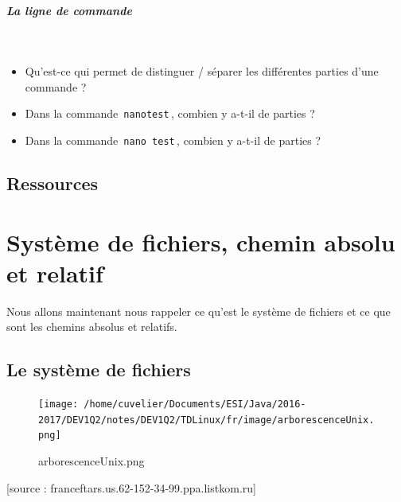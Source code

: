 \documentclass[11pt,a4paper]{article}
\begin{document}
			
		\subparagraph{La ligne de commande} 
		
                \textcolor{white}{.} \par
            
					\begin{itemize}
				
			\item 
										Qu'est-ce qui permet de distinguer / s\'eparer les diff\'erentes parties d'une commande ? 
										 \textcolor{gray}{\underline{\hspace*{10em}}} 
			\item 
										Dans la commande \,\verb|nanotest|\,, combien y a-t-il de parties ?  
										 \textcolor{gray}{\underline{\hspace*{1em}}} 
			\item 
										Dans la commande \,\verb|nano test|\,, combien y a-t-il de parties ?  
										 \textcolor{gray}{\underline{\hspace*{1em}}} 
					\end{itemize}
				\subsection{Ressources}\section{Syst\`eme de fichiers, chemin absolu et relatif}
				Nous allons maintenant nous rappeler ce qu'est le syst\`eme de fichiers et ce que sont les chemins absolus et relatifs.
			
            \par
        \subsection{Le syst\`eme de fichiers}\begin{figure}[hbt]
				    \begin{center}
					\texttt{[image: /home/cuvelier/Documents/ESI/Java/2016-2017/DEV1Q2/notes/DEV1Q2/TDLinux/fr/image/arborescenceUnix.png]}
						\end{center}
                
                    \caption[arborescenceUnix.png]{arborescenceUnix.png}
                \end{figure}
                    
			    
			    [source : franceftars.us.62-152-34-99.ppa.listkom.ru]
        
\end{document}
